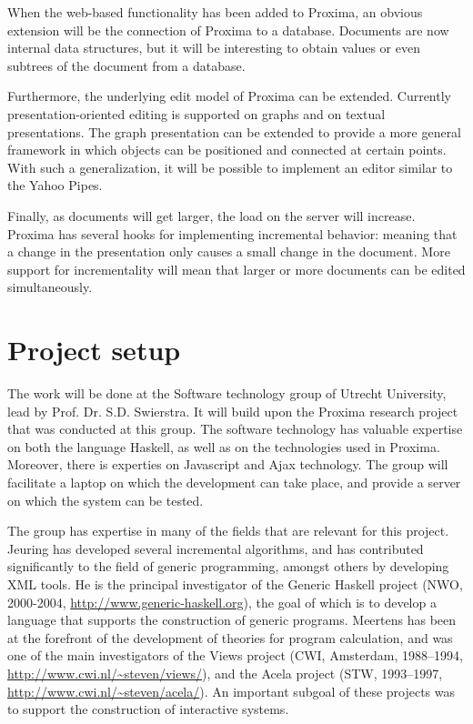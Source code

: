 \documentclass[10pt]{article}
\begin{document}
When the web-based functionality has been added to Proxima, an obvious extension will be the connection of Proxima to a database. Documents are now internal data structures, but it will be interesting to obtain values or even subtrees of the document from a database.

Furthermore, the underlying edit model of Proxima can be extended. Currently presentation-oriented editing is supported on graphs and on textual presentations. The graph presentation can be extended to provide a more general framework in which objects can be positioned and connected at certain points. With such a generalization, it will be possible to implement an editor similar to the Yahoo Pipes.

Finally, as documents will get larger, the load on the server will increase. Proxima has several hooks for implementing incremental behavior: meaning that a change in the presentation only causes a small change in the document. More support for incrementality will mean that larger or more documents can be edited simultaneously.


\section{Project setup}

The work will be done at the Software technology group of Utrecht University, lead by Prof. Dr. S.D. Swierstra. It will build upon the Proxima research project that was conducted at this group. The software technology has valuable expertise on both the language Haskell, as well as on the technologies used in Proxima. Moreover, there is experties on Javascript and Ajax technology. The group will facilitate a laptop on which the development can take place, and provide a server on which the system can be tested.

\bc
The group has expertise in many of the fields that are relevant for
this project.
Jeuring has developed several incremental algorithms, and has 
contributed significantly to the field of generic programming, amongst
others by developing XML tools. He is the principal investigator of
the Generic Haskell project (NWO, 2000-2004, \url{http://www.generic-haskell.org}),
the goal of which is to develop a language that supports the construction of generic
programs. Meertens has been at the forefront of the development of
theories for program calculation, and was one of the main
investigators of the Views project (CWI, Amsterdam, 1988--1994, 
\url{http://www.cwi.nl/~steven/views/}), 
and the Acela project (STW, 1993--1997, 
\url{http://www.cwi.nl/~steven/acela/}). An important subgoal of
these projects was to support the construction of interactive systems.
\end{document}
